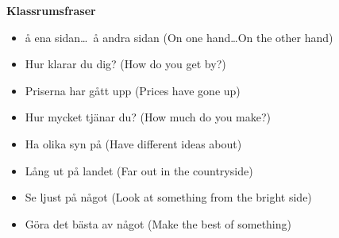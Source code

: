 
\begin{flushleft}
    \textbf{Klassrumsfraser}
    \begin{itemize}
        \item å ena sidan\ldots\ å andra sidan (On one hand\ldots On the other hand)
        \item Hur klarar du dig? (How do you get by?)
        \item Priserna har gått upp (Prices have gone up)
        \item Hur mycket tjänar du? (How much do you make?)
        \item Ha olika syn på (Have different ideas about)
        \item Lång ut på landet (Far out in the countryside)
        \item Se ljust på något  (Look at something from the bright side)
        \item Göra det bästa av något (Make the best of something)
    \end{itemize}
\end{flushleft}


